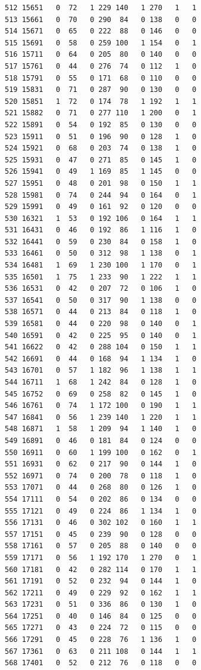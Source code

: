 \documentclass[
  letterpaper,
]{scrbook}
\begin{document}
\begin{verbatim}
512 15651   0  72   1 229 140   1 270   1   1
513 15661   0  70   0 290  84   0 138   0   0
514 15671   0  65   0 222  88   0 146   0   0
515 15691   0  58   0 259 100   1 154   0   1
516 15711   0  64   0 205  80   0 140   0   0
517 15761   0  44   0 276  74   0 112   1   0
518 15791   0  55   0 171  68   0 110   0   0
519 15831   0  71   0 287  90   0 130   0   0
520 15851   1  72   0 174  78   1 192   1   1
521 15882   0  71   0 277 110   1 200   0   1
522 15891   0  54   0 192  85   0 130   0   0
523 15911   0  51   0 196  90   0 128   1   0
524 15921   0  68   0 203  74   0 138   1   0
525 15931   0  47   0 271  85   0 145   1   0
526 15941   0  49   1 169  85   1 145   0   0
527 15951   0  48   0 201  98   0 150   1   1
528 15981   0  74   0 244  94   0 164   0   1
529 15991   0  49   0 161  92   0 120   0   0
530 16321   1  53   0 192 106   0 164   1   1
531 16431   0  46   0 192  86   1 116   1   0
532 16441   0  59   0 230  84   0 158   1   0
533 16461   0  50   0 312  98   1 138   0   1
534 16481   1  69   1 230 100   1 170   0   1
535 16501   1  75   1 233  90   1 222   1   1
536 16531   0  42   0 207  72   0 106   1   0
537 16541   0  50   0 317  90   1 138   0   0
538 16571   0  44   0 213  84   0 118   1   0
539 16581   0  44   0 220  98   0 140   0   1
540 16591   0  42   0 225  95   0 140   0   1
541 16622   0  42   0 288 104   0 150   1   1
542 16691   0  44   0 168  94   1 134   1   0
543 16701   0  57   1 182  96   1 138   1   1
544 16711   1  68   1 242  84   0 128   1   0
545 16752   0  69   0 258  82   0 145   1   0
546 16761   0  74   1 172 100   0 190   1   1
547 16841   0  56   1 239 140   1 220   1   1
548 16871   1  58   1 209  94   1 140   1   0
549 16891   0  46   0 181  84   0 124   0   0
550 16911   0  60   1 199 100   0 162   0   1
551 16931   0  62   0 217  90   0 144   1   0
552 16971   0  74   0 200  78   0 118   1   0
553 17071   0  44   0 268  80   0 126   1   0
554 17111   0  54   0 202  86   0 134   0   0
555 17121   0  49   0 224  86   1 134   1   0
556 17131   0  46   0 302 102   0 160   1   1
557 17151   0  45   0 239  90   0 128   0   0
558 17161   0  57   0 205  88   0 140   0   0
559 17171   0  56   1 192 170   1 270   0   1
560 17181   0  42   0 282 114   0 170   1   1
561 17191   0  52   0 232  94   0 144   1   0
562 17211   0  49   0 229  92   0 162   1   1
563 17231   0  51   0 336  86   0 130   1   0
564 17251   0  40   0 146  84   0 125   0   0
565 17271   0  43   0 224  72   0 115   0   0
566 17291   0  45   0 228  76   1 136   1   0
567 17361   0  63   0 211 108   0 144   1   1
568 17401   0  52   0 212  76   0 118   0   0

\end{verbatim}
\end{document}
